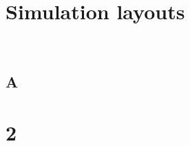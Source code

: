 \begin{appendices}
\chapter{Simulation layouts}
\thispagestyle{empty}
\vspace{38em}
\hrulefill
\\
\newpage
\section{A}


\chapter{2}
\end{appendices}
